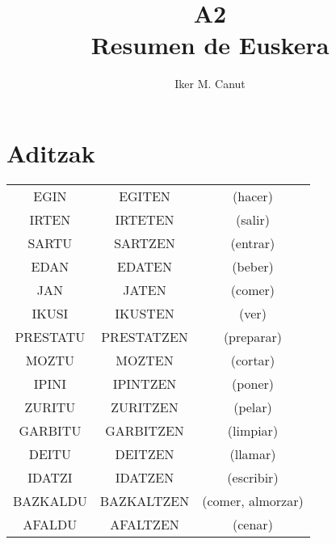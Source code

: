 \documentclass[12pt, a4paper, landscape]{article}
\begin{document}
\author{Iker M. Canut}
\title{A2\\
\large{Resumen de Euskera\\}
}
\maketitle
\newpage

\tableofcontents
\newpage

\section{Aditzak}
\begin{center}
\begin{table}[h]
\begin{tabular}{c | c | c}
EGIN & EGITEN & (hacer) \\
IRTEN & IRTETEN & (salir) \\
SARTU & SARTZEN & (entrar) \\
EDAN & EDATEN & (beber) \\
JAN & JATEN & (comer) \\
IKUSI & IKUSTEN & (ver) \\
PRESTATU & PRESTATZEN & (preparar) \\
MOZTU & MOZTEN & (cortar) \\
IPINI & IPINTZEN & (poner) \\
ZURITU & ZURITZEN & (pelar) \\
GARBITU & GARBITZEN & (limpiar) \\
DEITU & DEITZEN & (llamar) \\
IDATZI & IDATZEN & (escribir) \\
BAZKALDU & BAZKALTZEN & (comer, almorzar) \\
AFALDU & AFALTZEN & (cenar) \\
\end{tabular}
\end{table}
\end{center}

\newpage
\end{document}
